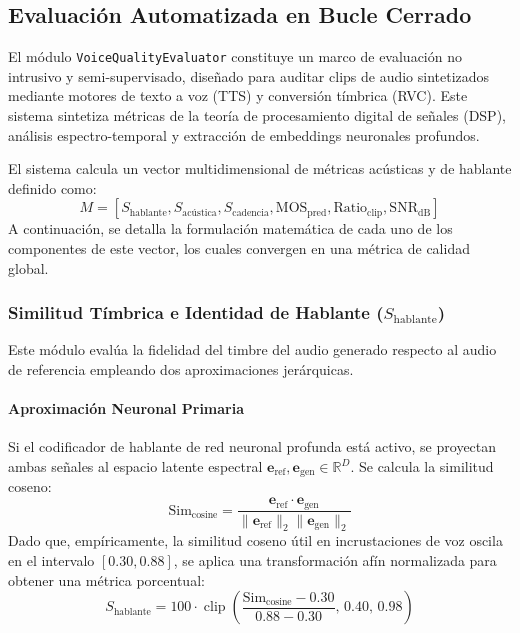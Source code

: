 \documentclass[conference]{IEEEtran}
\begin{document}
\subsection{Evaluación Automatizada en Bucle Cerrado}
El módulo \texttt{VoiceQualityEvaluator} constituye un marco de evaluación no intrusivo y semi-supervisado, diseñado para auditar clips de audio sintetizados mediante motores de texto a voz (TTS) y conversión tímbrica (RVC). Este sistema sintetiza métricas de la teoría de procesamiento digital de señales (DSP), análisis espectro-temporal y extracción de embeddings neuronales profundos.

El sistema calcula un vector multidimensional de métricas acústicas y de hablante definido como:
\begin{equation}
	M = [S_{\text{hablante}}, S_{\text{acústica}}, S_{\text{cadencia}}, \text{MOS}_{\text{pred}}, \text{Ratio}_{\text{clip}}, \text{SNR}_{\text{dB}}]
\end{equation}
A continuación, se detalla la formulación matemática de cada uno de los componentes de este vector, los cuales convergen en una métrica de calidad global.

\subsubsection{Similitud Tímbrica e Identidad de Hablante ($S_{\text{hablante}}$)}
Este módulo evalúa la fidelidad del timbre del audio generado respecto al audio de referencia empleando dos aproximaciones jerárquicas.

\paragraph{Aproximación Neuronal Primaria}
Si el codificador de hablante de red neuronal profunda está activo, se proyectan ambas señales al espacio latente espectral $\mathbf{e}_{\text{ref}}, \mathbf{e}_{\text{gen}} \in \mathbb{R}^D$. Se calcula la similitud coseno:
\begin{equation}
	\text{Sim}_{\text{cosine}} = \frac{\mathbf{e}_{\text{ref}} \cdot \mathbf{e}_{\text{gen}}}{\|\mathbf{e}_{\text{ref}}\|_2 \|\mathbf{e}_{\text{gen}}\|_2}
\end{equation}
Dado que, empíricamente, la similitud coseno útil en incrustaciones de voz oscila en el intervalo $[0.30, 0.88]$, se aplica una transformación afín normalizada para obtener una métrica porcentual:
\begin{equation}
	S_{\text{hablante}} = 100 \cdot \operatorname{clip}\left( \frac{\text{Sim}_{\text{cosine}} - 0.30}{0.88 - 0.30}, \, 0.40, \, 0.98 \right)
\end{equation}
\end{document}
